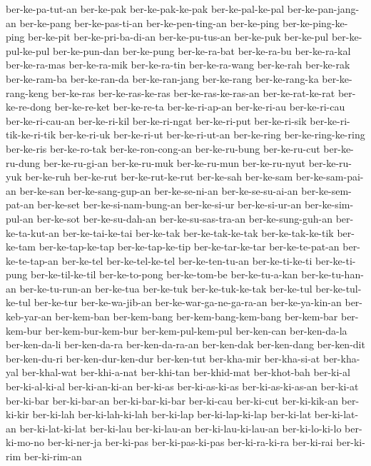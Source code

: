 {ber-ke-pa-tut-an ber-ke-pak ber-ke-pak-ke-pak ber-ke-pal-ke-pal
ber-ke-pan-jang-an ber-ke-pang ber-ke-pas-ti-an ber-ke-pen-ting-an
ber-ke-ping ber-ke-ping-ke-ping ber-ke-pit ber-ke-pri-ba-di-an
ber-ke-pu-tus-an ber-ke-puk ber-ke-pul ber-ke-pul-ke-pul ber-ke-pun-dan
ber-ke-pung ber-ke-ra-bat ber-ke-ra-bu ber-ke-ra-kal ber-ke-ra-mas
ber-ke-ra-mik ber-ke-ra-tin ber-ke-ra-wang ber-ke-rah ber-ke-rak
ber-ke-ram-ba ber-ke-ran-da ber-ke-ran-jang ber-ke-rang ber-ke-rang-ka
ber-ke-rang-keng ber-ke-ras ber-ke-ras-ke-ras ber-ke-ras-ke-ras-an
ber-ke-rat-ke-rat ber-ke-re-dong ber-ke-re-ket ber-ke-re-ta
ber-ke-ri-ap-an ber-ke-ri-au ber-ke-ri-cau ber-ke-ri-cau-an ber-ke-ri-kil
ber-ke-ri-ngat ber-ke-ri-put ber-ke-ri-sik ber-ke-ri-tik-ke-ri-tik
ber-ke-ri-uk ber-ke-ri-ut ber-ke-ri-ut-an ber-ke-ring ber-ke-ring-ke-ring
ber-ke-ris ber-ke-ro-tak ber-ke-ron-cong-an ber-ke-ru-bung ber-ke-ru-cut
ber-ke-ru-dung ber-ke-ru-gi-an ber-ke-ru-muk ber-ke-ru-mun ber-ke-ru-nyut
ber-ke-ru-yuk ber-ke-ruh ber-ke-rut ber-ke-rut-ke-rut ber-ke-sah
ber-ke-sam ber-ke-sam-pai-an ber-ke-san ber-ke-sang-gup-an ber-ke-se-ni-an
ber-ke-se-su-ai-an ber-ke-sem-pat-an ber-ke-set ber-ke-si-nam-bung-an
ber-ke-si-ur ber-ke-si-ur-an ber-ke-sim-pul-an ber-ke-sot ber-ke-su-dah-an
ber-ke-su-sas-tra-an ber-ke-sung-guh-an ber-ke-ta-kut-an ber-ke-tai-ke-tai
ber-ke-tak ber-ke-tak-ke-tak ber-ke-tak-ke-tik ber-ke-tam
ber-ke-tap-ke-tap ber-ke-tap-ke-tip ber-ke-tar-ke-tar ber-ke-te-pat-an
ber-ke-te-tap-an ber-ke-tel ber-ke-tel-ke-tel ber-ke-ten-tu-an
ber-ke-ti-ke-ti ber-ke-ti-pung ber-ke-til-ke-til ber-ke-to-pong
ber-ke-tom-be ber-ke-tu-a-kan ber-ke-tu-han-an ber-ke-tu-run-an ber-ke-tua
ber-ke-tuk ber-ke-tuk-ke-tak ber-ke-tul ber-ke-tul-ke-tul ber-ke-tur
ber-ke-wa-jib-an ber-ke-war-ga-ne-ga-ra-an ber-ke-ya-kin-an ber-keb-yar-an
ber-kem-ban ber-kem-bang ber-kem-bang-kem-bang ber-kem-bar ber-kem-bur
ber-kem-bur-kem-bur ber-kem-pul-kem-pul ber-ken-can ber-ken-da-la
ber-ken-da-li ber-ken-da-ra ber-ken-da-ra-an ber-ken-dak ber-ken-dang
ber-ken-dit ber-ken-du-ri ber-ken-dur-ken-dur ber-ken-tut ber-kha-mir
ber-kha-si-at ber-kha-yal ber-khal-wat ber-khi-a-nat ber-khi-tan
ber-khid-mat ber-khot-bah ber-ki-al ber-ki-al-ki-al ber-ki-an-ki-an
ber-ki-as ber-ki-as-ki-as ber-ki-as-ki-as-an ber-ki-at ber-ki-bar
ber-ki-bar-an ber-ki-bar-ki-bar ber-ki-cau ber-ki-cut ber-ki-kik-an
ber-ki-kir ber-ki-lah ber-ki-lah-ki-lah ber-ki-lap ber-ki-lap-ki-lap
ber-ki-lat ber-ki-lat-an ber-ki-lat-ki-lat ber-ki-lau ber-ki-lau-an
ber-ki-lau-ki-lau-an ber-ki-lo-ki-lo ber-ki-mo-no ber-ki-ner-ja ber-ki-pas
ber-ki-pas-ki-pas ber-ki-ra-ki-ra ber-ki-rai ber-ki-rim ber-ki-rim-an
}
